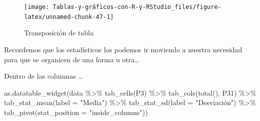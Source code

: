 \documentclass[
]{book}
\newenvironment{Shaded}{\begin{snugshade}}{\end{snugshade}}
\newcommand{\AttributeTok}[1]{\textcolor[rgb]{0.77,0.63,0.00}{#1}}
\newcommand{\FunctionTok}[1]{\textcolor[rgb]{0.00,0.00,0.00}{#1}}
\newcommand{\NormalTok}[1]{#1}
\newcommand{\OtherTok}[1]{\textcolor[rgb]{0.56,0.35,0.01}{#1}}
\newcommand{\SpecialCharTok}[1]{\textcolor[rgb]{0.00,0.00,0.00}{#1}}
\newcommand{\StringTok}[1]{\textcolor[rgb]{0.31,0.60,0.02}{#1}}
\begin{document}
\begin{Shaded}
\end{Shaded}

\begin{figure}[H]

{\centering \texttt{[image: Tablas-y-gráficos-con-R-y-RStudio\_files/figure-latex/unnamed-chunk-47-1]} 

}

\caption{Transposición de tabla}\label{fig:unnamed-chunk-47}
\end{figure}

Recordemos que los estadísticos los podemos ir moviendo a nuestra necesidad para que se organicen de una forma u otra\ldots{}

Dentro de las columnas \ldots{}

\begin{Shaded}
\begin{Highlighting}[]
\FunctionTok{as.datatable\_widget}\NormalTok{(data }\SpecialCharTok{\%\textgreater{}\%} \FunctionTok{tab\_cells}\NormalTok{(P3) }\SpecialCharTok{\%\textgreater{}\%} \FunctionTok{tab\_cols}\NormalTok{(}\FunctionTok{total}\NormalTok{(), }
\NormalTok{  P31) }\SpecialCharTok{\%\textgreater{}\%} \FunctionTok{tab\_stat\_mean}\NormalTok{(}\AttributeTok{label =} \StringTok{"Media"}\NormalTok{) }\SpecialCharTok{\%\textgreater{}\%} \FunctionTok{tab\_stat\_sd}\NormalTok{(}\AttributeTok{label =} \StringTok{"Desviación"}\NormalTok{) }\SpecialCharTok{\%\textgreater{}\%} 
  \FunctionTok{tab\_pivot}\NormalTok{(}\AttributeTok{stat\_position =} \StringTok{"inside\_columns"}\NormalTok{))}
\end{Highlighting}
\end{Shaded}
\end{document}
